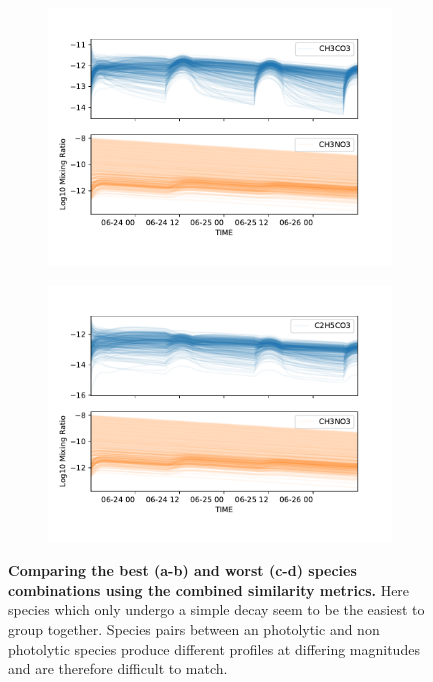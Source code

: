 \begin{figure}[H]
  \begin{subfigure}[t]{.5\textwidth}
    \centering
    \includegraphics[width=\textwidth]{ensemble/CH3CO3-CH3NO3.pdf}
    \caption{}
  \end{subfigure}%
  \begin{subfigure}[t]{.5\textwidth}
    \centering
    \includegraphics[width=\textwidth]{ensemble/C2H5CO3-CH3NO3.pdf}
    \caption{}
  \end{subfigure}%
  \caption{\textbf{Comparing the best (a-b) and worst (c-d) species combinations using the combined similarity metrics.} Here species which only undergo a simple decay seem to be the easiest to group together. Species pairs between an photolytic and non photolytic species produce different profiles at differing magnitudes and are therefore difficult to match.}
  \label{fig:bestworst}
  \end{figure}






